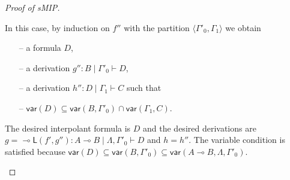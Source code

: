 \documentclass[sn-mathphys-num]{sn-jnl}%
\newcommand{\GG}{\Gamma}
\newcommand{\GL}{\Lambda}
\newcommand{\vd}{\vdash}
\newcommand{\lolli}{\multimap}
\newcommand{\lleft}{{\lolli}\mathsf{L}}
\newcommand{\mf}[1]{\mathsf{#1}}
\newcommand{\vars}[1]{\mf{var} (#1)}
\newcommand{\sMIP}{\textsf{sMIP}}
\theoremstyle{thmstyleone}%
\theoremstyle{thmstyletwo}%
\theoremstyle{thmstylethree}%
\begin{document}
\begin{proof}[Proof of \sMIP]
\begin{itemize}
    In this case, by induction on $f''$ with the partition $\langle \GG'_0 , \GG_1 \rangle$ we obtain
    \begin{itemize}
      \item[--]  a formula $D$,
      \item[--] a derivation $g'' : B \mid \GG'_0 \vd D$,
      \item[--] a derivation $h'' : D \mid \GG_1 \vd C$ such that 
      \item[--] $\vars{D} \subseteq \vars{B , \GG'_0} \cap \vars{\GG_1 , C}$.
    \end{itemize}
    The desired interpolant formula is $D$ and the desired derivations are $g = \lleft (f' , g'') : A \lolli B \mid \GL , \GG'_0 \vd D$ and $h = h''$.
    The variable condition is satisfied because $\vars{D} \subseteq \vars{B , \GG'_0} \subseteq \vars{A \lolli B , \GL , \GG'_0}$.
    

\end{itemize}
\end{proof}
\end{document}
